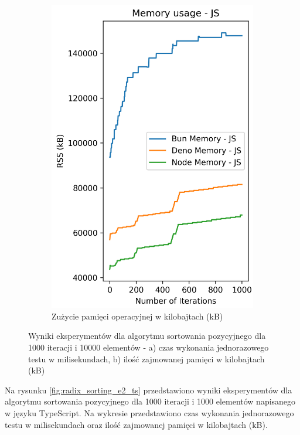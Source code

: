 \begin{figure}[H]
\begin{subfigure}[b]{0.4\textwidth}
    \includegraphics[width=\textwidth]{Figures/sorting/sorting_radix_1000_1000_js_memory.png}
    \caption{Zużycie pamięci operacyjnej w kilobajtach (kB)}
    \label{fig:radix_sorting_e2_memory}
  \end{subfigure}
  \caption{Wyniki eksperymentów dla algorytmu sortowania pozycyjnego dla 1000 iteracji i 10000 elementów - a) czas wykonania jednorazowego testu w milisekundach, b) ilość zajmowanej pamięci w kilobajtach (kB)}
  \label{fig:radix_sorting_e2}
\end{figure}

Na rysunku \ref{fig:radix_sorting_e2_ts} przedstawiono wyniki eksperymentów dla algorytmu sortowania pozycyjnego dla 1000 iteracji i 1000 elementów napisanego w języku TypeScript. Na wykresie przedstawiono czas wykonania jednorazowego testu w milisekundach oraz ilość zajmowanej pamięci w kilobajtach (kB).


